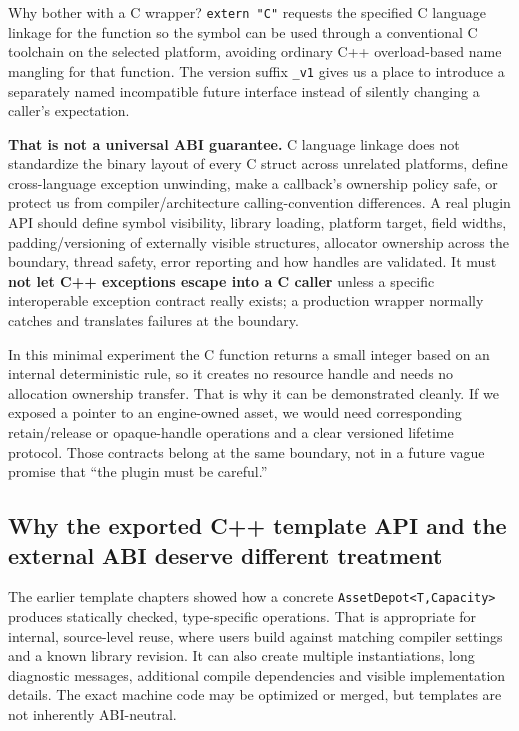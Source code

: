 Why bother with a C wrapper? \texttt{extern\ "C"} requests the specified C language linkage for the function so the symbol can be used through a conventional C toolchain on the selected platform, avoiding ordinary C++ overload-based name mangling for that function. The version suffix \texttt{\_v1} gives us a place to introduce a separately named incompatible future interface instead of silently changing a caller's expectation.

\textbf{That is not a universal ABI guarantee.} C language linkage does not standardize the binary layout of every C struct across unrelated platforms, define cross-language exception unwinding, make a callback's ownership policy safe, or protect us from compiler/architecture calling-convention differences. A real plugin API should define symbol visibility, library loading, platform target, field widths, padding/versioning of externally visible structures, allocator ownership across the boundary, thread safety, error reporting and how handles are validated. It must \textbf{not let C++ exceptions escape into a C caller} unless a specific interoperable exception contract really exists; a production wrapper normally catches and translates failures at the boundary.

In this minimal experiment the C function returns a small integer based on an internal deterministic rule, so it creates no resource handle and needs no allocation ownership transfer. That is why it can be demonstrated cleanly. If we exposed a pointer to an engine-owned asset, we would need corresponding retain/release or opaque-handle operations and a clear versioned lifetime protocol. Those contracts belong at the same boundary, not in a future vague promise that ``the plugin must be careful.''

\subsection{Why the exported C++ template API and the external ABI deserve different treatment}\label{01-foundations-i-ch006-why-the-exported-c-template-api-and-the-external-abi-deserve-different-treatment}

The earlier template chapters showed how a concrete \texttt{AssetDepot\textless{}T,Capacity\textgreater{}} produces statically checked, type-specific operations. That is appropriate for internal, source-level reuse, where users build against matching compiler settings and a known library revision. It can also create multiple instantiations, long diagnostic messages, additional compile dependencies and visible implementation details. The exact machine code may be optimized or merged, but templates are not inherently ABI-neutral.

